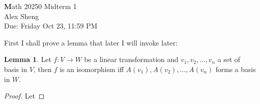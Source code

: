 \documentclass[]{book}
\theoremstyle{definition}
\newtheorem*{lem*}{Lemma}
\newcommand{\0}{\mathbf{0}}
\begin{document}
\begin{center}
{\Large\textbf Math 20250 \hspace{0.5cm} Midterm 1}\\
\large{Alex Sheng}\\
\normalsize{Due: Friday Oct 23, 11:59 PM}
\end{center}

\vspace{0.2 cm}

\noindent First I shall prove a lemma that later I will invoke later:

\begin{lem*}\label{lemma}
Let $f:V\to W$ be a linear transformation and $v_1,v_2,...,v_n$ a set of basis in $V$, then $f$ is an isomorphism iff $A(v_1),A(v_2),...,A(v_n)$ forms a basis in $W$.
\end{lem*}
\begin{proof}
Let 
\end{proof}
\end{document}
